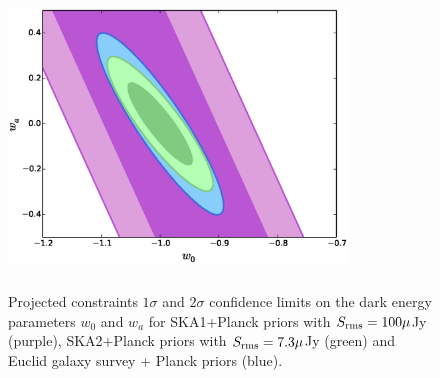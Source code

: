 \documentclass[useAMS,usenatbib]{mn2e}
\begin{document}
\begin{figure}
\begin{center}
\includegraphics[height=8.0cm,width=9.0cm]{plots/output_ellipse_w0_wa_14bins_70_3.eps} 
\caption{Projected constraints $1 \sigma$ and $2\sigma$ confidence limits on the dark energy parameters $w_0$ and $w_a$ for  SKA1+Planck priors with $S_{\rm rms} = 100 \mu $Jy (purple), SKA2+Planck priors with  $S_{\rm rms} = 7.3 \mu $Jy (green) and Euclid galaxy survey + Planck priors (blue).}
\label{Fig:w_wa}
\end{center}
\end{figure}

\end{document}
